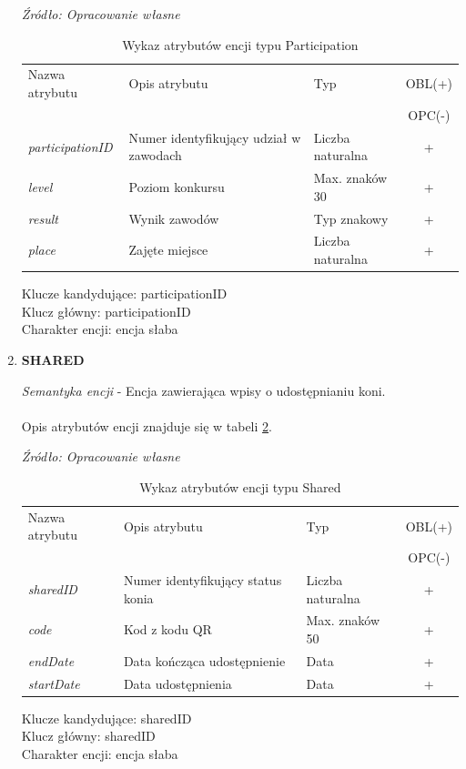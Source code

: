 \documentclass[12pt,twoside]{report}
\begin{document}
\begin{enumerate}[start=10,label={\bfseries ENC$\backslash$\arabic*}]
\begin{table}[H]
	\caption{Wykaz atrybutów encji typu Participation }
	\textit{Źródło: Opracowanie własne}
	\label{ParticipationAtribute}
	\centering
	\begin{tabular}{|l|l|l|c|}
		\hline
		Nazwa atrybutu & Opis atrybutu & Typ & OBL(+) \\
		& & &  OPC(-) \\
		\hline
		\textit{participationID} & Numer identyfikujący udział w zawodach & Liczba naturalna & + \\
		\hline
		\textit{level} & Poziom konkursu & Max. znaków 30 & + \\
		\hline
		\textit{result} & Wynik zawodów & Typ znakowy & + \\
		\hline
		\textit{place} & Zajęte miejsce &  Liczba naturalna & + \\
		\hline
	\end{tabular}
\end{table}
Klucze kandydujące: participationID \\
Klucz główny: participationID \\
Charakter encji: encja słaba \\

\item \textbf{SHARED}

\textit{Semantyka encji} - Encja zawierająca wpisy o udostępnianiu koni.
			\\ \\
Opis atrybutów encji znajduje się w tabeli \ref{SharedAtribute}.

\begin{table}[H]
	\caption{Wykaz atrybutów encji typu Shared }
	\textit{Źródło: Opracowanie własne}
	\label{SharedAtribute}
	\centering
	\begin{tabular}{|l|l|l|c|}
		\hline
		Nazwa atrybutu & Opis atrybutu & Typ & OBL(+) \\
		& & &  OPC(-) \\
		\hline
		\textit{sharedID} & Numer identyfikujący status konia & Liczba naturalna & + \\
		\hline
		\textit{code} &  Kod z kodu QR & Max. znaków 50 & + \\
		\hline
		\textit{endDate} &  Data kończąca udostępnienie & Data & + \\
		\hline
		\textit{startDate} &  Data udostępnienia & Data & + \\
		\hline
	\end{tabular}
\end{table}
Klucze kandydujące: sharedID \\
Klucz główny: sharedID \\
Charakter encji: encja słaba \\



\end{enumerate}
\end{document}
